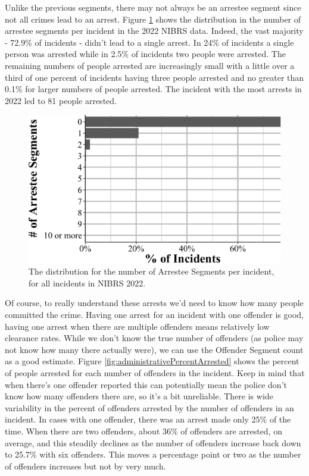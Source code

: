 \documentclass[
  12pt,
  openany]{book}
\begin{document}
Unlike the previous segments, there may not always be an arrestee segment since not all crimes lead to an arrest. Figure \ref{fig:administrativeArresteeSegments} shows the distribution in the number of arrestee segments per incident in the 2022 NIBRS data. Indeed, the vast majority - 72.9\% of incidents - didn't lead to a single arrest. In 24\% of incidents a single person was arrested while in 2.5\% of incidents two people were arrested. The remaining numbers of people arrested are increasingly small with a little over a third of one percent of incidents having three people arrested and no greater than 0.1\% for larger numbers of people arrested. The incident with the most arrests in 2022 led to 81 people arrested.

\begin{figure}

{\centering \includegraphics[width=0.9\linewidth]{12_nibrs_administrative_files/figure-latex/administrativeArresteeSegments-1} 

}

\caption{The distribution for the number of Arrestee Segments per incident, for all incidents in NIBRS 2022.}\label{fig:administrativeArresteeSegments}
\end{figure}

Of course, to really understand these arrests we'd need to know how many people committed the crime. Having one arrest for an incident with one offender is good, having one arrest when there are multiple offenders means relatively low clearance rates. While we don't know the true number of offenders (as police may not know how many there actually were), we can use the Offender Segment count as a good estimate. Figure \ref{fig:administrativePercentArrested} shows the percent of people arrested for each number of offenders in the incident. Keep in mind that when there's one offender reported this can potentially mean the police don't know how many offenders there are, so it's a bit unreliable. There is wide variability in the percent of offenders arrested by the number of offenders in an incident. In cases with one offender, there was an arrest made only 25\% of the time. When there are two offenders, about 36\% of offenders are arrested, on average, and this steadily declines as the number of offenders increase back down to 25.7\% with six offenders. This moves a percentage point or two as the number of offenders increases but not by very much.
\end{document}
